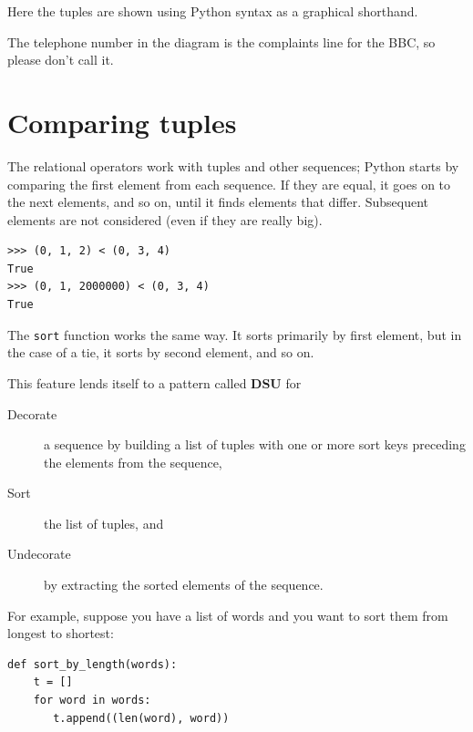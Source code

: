 \documentclass[10pt]{book}
\begin{document}
\begin{CJK}{UTF8}{gbsn}
Here the tuples are shown using Python syntax as a graphical
shorthand.

The telephone number in the diagram is the complaints line for the
BBC, so please don't call it.



\section{Comparing tuples}

The relational operators work with tuples and other sequences;
Python starts by comparing the first element from each
sequence.  If they are equal, it goes on to the next elements,
and so on, until it finds elements that differ.  Subsequent
elements are not considered (even if they are really big).

\begin{verbatim}
>>> (0, 1, 2) < (0, 3, 4)
True
>>> (0, 1, 2000000) < (0, 3, 4)
True
\end{verbatim}
%
The {\tt sort} function works the same way.  It sorts 
primarily by first element, but in the case of a tie, it sorts
by second element, and so on.  

This feature lends itself to a pattern called {\bf DSU} for 

\begin{description}

\item[Decorate] a sequence by building a list of tuples
with one or more sort keys preceding the elements from the sequence,

\item[Sort] the list of tuples, and

\item[Undecorate] by extracting the sorted elements of the sequence.

\end{description}

\label{DSU}

For example, suppose you have a list of words and you want to
sort them from longest to shortest:

\begin{verbatim}
def sort_by_length(words):
    t = []
    for word in words:
       t.append((len(word), word))


\end{verbatim}
\end{CJK}
\end{document}
